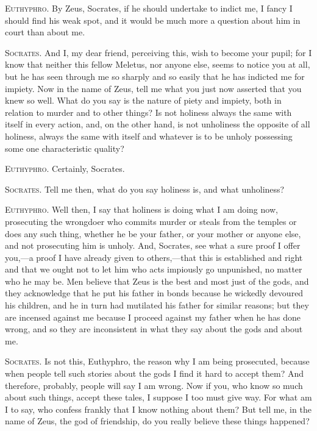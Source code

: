 \textsc{Euthyphro}. By Zeus, Socrates, if he should undertake to
indict me, I fancy I should find his weak spot, and it would be much
more a question about him in court than about me.

\textsc{Socrates}. And I, my dear friend, perceiving this, wish to
become your pupil; for I know that neither  this fellow
Meletus, nor anyone else, seems to notice you at all, but he has seen
through me so sharply and so easily that he has indicted me for
impiety. Now in the name of Zeus, tell me what you just now asserted
that you knew so well. What do you say is the nature of piety and
impiety, both in relation to murder and to other things? Is not
holiness always the same with itself in every action, and, on the
other hand, is not unholiness the opposite of all holiness, always the
same with itself and whatever is to be unholy possessing some one
characteristic quality?

\textsc{Euthyphro}. Certainly, Socrates.

\textsc{Socrates}. Tell me then, what do you say holiness is, and what
unholiness?

\textsc{Euthyphro}. Well then, I say that holiness is doing what I am
doing now, prosecuting the wrongdoer who commits murder or steals from
the temples or does any such thing, whether he be your father, or your
mother or anyone else, and not prosecuting him is unholy. And,
Socrates, see what a sure proof I offer you,---a proof I have already
given to others,---that this is established and right and that we
ought not to let him who acts impiously go unpunished, no matter who
he may be. Men believe that Zeus is the best and most just of the
gods, and they acknowledge that he put his father in bonds because he
wickedly devoured his children, and he in turn had mutilated his
father for similar reasons; but they are incensed against me because I
proceed against my father when he has done wrong, and so they are
 inconsistent in what they say about the gods and about me.

\textsc{Socrates}. Is not this, Euthyphro, the reason why I am being
prosecuted, because when people tell such stories about the gods I
find it hard to accept them? And therefore, probably, people will say
I am wrong. Now if you, who know so much about such things, accept
these tales, I suppose I too must give way. For what am I to say, who
confess frankly that I know nothing about them? But tell me, in the
name of Zeus, the god of friendship, do you really believe these
things happened?

